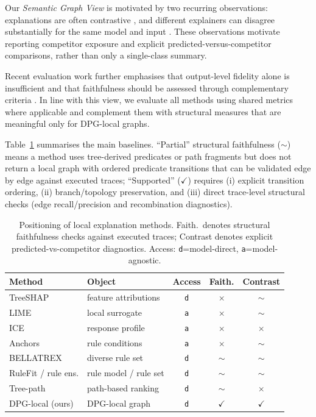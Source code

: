 \documentclass[runningheads]{llncs}
\begin{document}
Our \textit{Semantic Graph View} is motivated by two recurring observations: explanations are often contrastive \cite{miller2019explanation,van2021evaluating,LongoRizzo2024}, and different explainers can disagree substantially for the same model and input \cite{krishna2022disagreement}.
 These observations motivate reporting competitor exposure and explicit predicted-versus-competitor comparisons, rather than only a single-class summary.
 

 Recent evaluation work further emphasises that output-level fidelity alone is insufficient and that faithfulness should be assessed through complementary criteria \cite{nauta2023anecdotal,doshi2017rigorous}. In line with this view, we evaluate all methods using shared metrics where applicable and complement them with structural measures that are meaningful only for DPG-local graphs. 

Table~\ref{tab:positioning} summarises the main baselines. ``Partial'' structural faithfulness ($\sim$) means a method uses tree-derived predicates or path fragments but does not return a local graph with ordered predicate transitions that can be validated edge by edge against executed traces; ``Supported'' ($\checkmark$) requires (i) explicit transition ordering, (ii) branch/topology preservation, and (iii) direct trace-level structural checks (edge recall/precision and recombination diagnostics).


\begin{table}[h!]
\centering
\caption{Positioning of local explanation methods. Faith.\ denotes structural faithfulness checks against executed traces; Contrast denotes explicit predicted-vs-competitor diagnostics. Access: \texttt{d}=model-direct, \texttt{a}=model-agnostic.}
\label{tab:positioning}
\small
\setlength{\tabcolsep}{6pt}
\begin{tabular}{l l c c c}
\hline
Method & Object & Access & Faith. & Contrast \\
\hline
TreeSHAP \cite{lundberg2018consistent} & feature attributions & \texttt{d} & $\times$ & $\sim$ \\
LIME \cite{ribeiro2016why} & local surrogate & \texttt{a} & $\times$ & $\sim$ \\
ICE \cite{goldstein2015ice} & response profile & \texttt{a} & $\times$ & $\times$ \\
Anchors \cite{ribeiro2018anchors} & rule conditions & \texttt{a} & $\times$ & $\sim$ \\
BELLATREX \cite{dedja2023bellatrex} & diverse rule set & \texttt{d} & $\sim$ & $\sim$ \\
RuleFit / rule ens. \cite{friedman2008predictive} & rule model / rule set & \texttt{d} & $\sim$ & $\sim$ \\
Tree-path \cite{palczewska2014interpreting} & path-based ranking & \texttt{d} & $\sim$ & $\times$ \\
\hline
DPG-local (ours) & DPG-local graph & \texttt{d} & $\checkmark$ & $\checkmark$ \\
\hline
\end{tabular}
\end{table}
\end{document}
